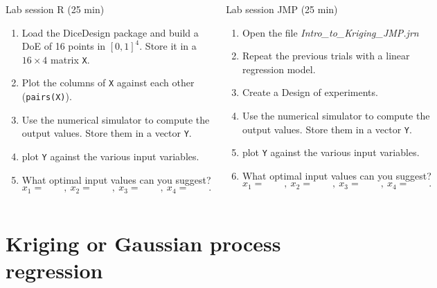\documentclass{beamer}
\begin{document}
\begin{frame}{}
\small
\begin{columns}[t]
\column{5cm}
\begin{exampleblock}{Lab session R (25 min)}
	\begin{enumerate}
		\item Load the DiceDesign package and build a DoE of 16 points in $[0,1]^4$. Store it in a $16 \times 4$ matrix \texttt{X}.
		\item Plot the columns of \texttt{X} against each other (\texttt{pairs(X)}).
		\item Use the numerical simulator to compute the output values. Store them in a vector \texttt{Y}.
		\item plot \texttt{Y} against the various input variables.
		\item What optimal input values can you suggest?
		$$ x_1 = \qquad,\ x_2 = \qquad,\ x_3 = \qquad,\ x_4 = \qquad.$$
	\end{enumerate}
\end{exampleblock}
\column{5cm}
\begin{exampleblock}{Lab session JMP (25 min)}
	\begin{enumerate}
		\item Open the file \emph{Intro\_to\_Kriging\_JMP.jrn}
		\item Repeat the previous trials with a linear regression model.
		\item Create a Design of experiments.
		\item Use the numerical simulator to compute the output values. Store them in a vector \texttt{Y}.
		\item plot \texttt{Y} against the various input variables.
		\item What optimal input values can you suggest?
		$$ x_1 = \qquad,\ x_2 = \qquad,\ x_3 = \qquad,\ x_4 = \qquad.$$
	\end{enumerate}
\end{exampleblock}
\end{columns}

\end{frame}

\section[Kriging]{Kriging or Gaussian process regression}
\end{document}
